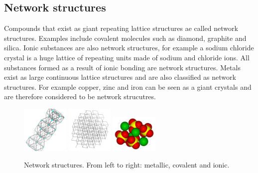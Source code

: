 \subsection*{Network structures}
Compounds that exist as giant repeating lattice structures ae called network structures. Examples include covalent molecules such as diamond, graphite and silica. Ionic substances are also network structures, for example a sodium chloride crystal is a huge lattice of repeating units made of sodium and chloride ions. All substances formed as a result of ionic bonding are network structures. Metals exist as large continuous lattice structures and are also classified as network structures. For example copper, zinc and iron can be seen as a giant crystals and are therefore considered to be network strucutres.
\begin{figure}[H]
 \begin{center}
\includegraphics[width=0.2\textwidth]{photos/copper_structure.png} 
\includegraphics[width=0.2\textwidth]{photos/Diamond_Carbon.png} 
\includegraphics[width=0.2\textwidth]{photos/BaSO4_wikipedia.png} 
 \end{center}
\caption{Network structures. From left to right: metallic, covalent and ionic.}
\end{figure}
